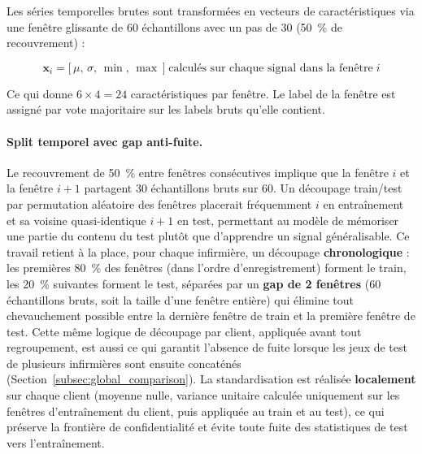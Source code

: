 \documentclass{article}
\begin{document}
Les séries temporelles brutes sont transformées en vecteurs de caractéristiques via
une fenêtre glissante de 60 échantillons avec un pas de 30 (50~\% de recouvrement) :

\begin{equation}
  \mathbf{x}_i = \bigl[\,\mu,\, \sigma,\, \min,\, \max\,\bigr]
  \;\text{calcul\'es sur chaque signal dans la fen\^etre}\; i
  \label{eq:features}
\end{equation}

Ce qui donne $6 \times 4 = 24$ caractéristiques par fenêtre. Le label de la fenêtre
est assigné par vote majoritaire sur les labels bruts qu'elle contient.

\paragraph{Split temporel avec gap anti-fuite.} Le recouvrement de 50~\% entre fenêtres
consécutives implique que la fenêtre $i$ et la fenêtre $i+1$ partagent 30 échantillons
bruts sur 60. Un découpage train/test par permutation aléatoire des fenêtres placerait
fréquemment $i$ en entraînement et sa voisine quasi-identique $i+1$ en test, permettant
au modèle de mémoriser une partie du contenu du test plutôt que d'apprendre un signal
généralisable. Ce travail retient à la place, pour chaque infirmière, un découpage
\textbf{chronologique} : les premières 80~\% des fenêtres
(dans l'ordre d'enregistrement) forment le train, les 20~\% suivantes forment le test,
séparées par un \textbf{gap de 2 fenêtres} (60 échantillons bruts, soit la taille
d'une fenêtre entière) qui élimine tout chevauchement possible entre la dernière
fenêtre de train et la première fenêtre de test. Cette même logique de découpage par
client, appliquée avant tout regroupement, est aussi ce qui garantit l'absence de
fuite lorsque les jeux de test de plusieurs infirmières sont ensuite concaténés
(Section~\ref{subsec:global_comparison}). La standardisation est réalisée
\textbf{localement} sur chaque client (moyenne nulle, variance unitaire calculée
uniquement sur les fenêtres d'entraînement du client, puis appliquée au train et au
test), ce qui préserve la frontière de confidentialité et évite toute fuite des
statistiques de test vers l'entraînement.
\end{document}
